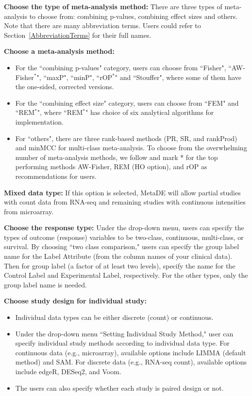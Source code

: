 \begin{steps}
\item \textbf{Choose the type of meta-analysis method:}
There are three types of meta-analysis to choose from:
combining p-values, combining effect sizes and others.
Note that there are many abbreviation terms.
Users could refer to Section~\ref{AbbreviationTerms} for their full names.


\item \textbf{Choose a meta-analysis method:}
\begin{itemize}
\item For the ``combining p-values" category,
users can choose from ``Fisher", ``AW-Fisher$^{\ast}$", ``maxP", ``minP", ``rOP$^{\ast}$" and ``Stouffer",
where some of them have the one-sided, corrected versions. 

\item For the ``combining effect size" category,
users can choose from ``FEM" and ``REM$^{\ast}$",
where ``REM$^{\ast}$" has choice of six analytical algorithms for implementation.

\item For ``others",
there are three rank-based methods (PR, SR, and rankProd) and minMCC for multi-class meta-analysis.
To choose from the overwhelming number of meta-analysis methods,
we follow \cite{chang2013meta} and mark * for the top performing methods AW-Fisher, REM (HO option), and rOP as recommendations for users.
\end{itemize}

\item \textbf{Mixed data type:}
If this option is selected,
MetaDE will allow partial studies with count data from RNA-seq and remaining studies with continuous intensities from microarray.

\item \textbf{Choose the response type:}
Under the drop-down menu,
users can specify the types of outcome (response) variables to be two-class, continuous, multi-class, or survival.
By choosing ``two class comparison,"
users can specify the group label name for the Label Attribute (from the column names of your clinical data).
Then for group label (a factor of at least two levels),
specify the name for the Control Label and Experimental Label, respectively.
For the other types, only the group label name is needed.

\item \textbf{Choose study design for individual study:}
\begin{itemize}
\item Individual data types can be either discrete (count) or continuous.
\item Under the drop-down menu ``Setting Individual Study Method," 
user can specify  individual study methods according to individual data type.
For continuous data (e.g., microarray), available options include LIMMA (default method) and SAM.
For discrete data (e.g., RNA-seq count), available options include edgeR, DESeq2, and Voom.
\item The users can also specify whether each study is paired design or not.
\end{itemize}


\end{steps}
